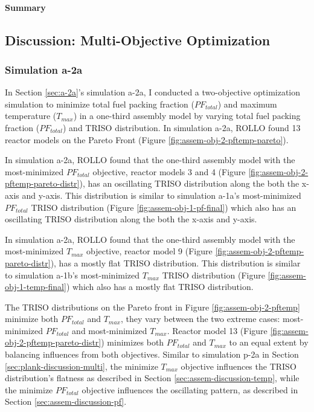 \paragraph{Summary}

\subsection{Discussion: Multi-Objective Optimization}
\label{sec:assem-discussion-multi}

\subsubsection{Simulation a-2a}
In Section \ref{sec:a-2a}'s simulation a-2a, I conducted a two-objective 
optimization simulation to minimize total fuel packing fraction ($PF_{total}$) and 
maximum temperature ($T_{max}$) in a one-third assembly model by varying total fuel 
packing fraction ($PF_{total}$) and TRISO distribution. 
In simulation a-2a, ROLLO found 13 reactor models on the Pareto Front (Figure 
\ref{fig:assem-obj-2-pftemp-pareto}). 

In simulation a-2a, \gls{ROLLO} found that the one-third assembly model with the 
most-minimized $PF_{total}$ objective, reactor models 3 and 4 (Figure 
\ref{fig:assem-obj-2-pftemp-pareto-distr}), has an oscillating TRISO distribution 
along the both the x-axis and y-axis. 
This distribution is similar to simulation a-1a's most-minimized $PF_{total}$ TRISO 
distribution (Figure \ref{fig:assem-obj-1-pf-final}) which also has an oscillating 
TRISO distribution along the both the x-axis and y-axis. 

In simulation a-2a, \gls{ROLLO} found that the one-third assembly model with the 
most-minimized $T_{max}$ objective, reactor model 9 (Figure 
\ref{fig:assem-obj-2-pftemp-pareto-distr}), has a mostly flat TRISO distribution. 
This distribution is similar to simulation a-1b's most-minimized $T_{max}$ TRISO 
distribution  (Figure \ref{fig:assem-obj-1-temp-final}) which also has a mostly 
flat TRISO distribution. 
 
The \gls{TRISO} distributions on the Pareto front in Figure \ref{fig:assem-obj-2-pftemp} 
minimize both $PF_{total}$ and $T_{max}$, they vary between the two extreme cases: 
most-minimized $PF_{total}$ and most-minimized $T_{max}$. 
Reactor model 13 (Figure \ref{fig:assem-obj-2-pftemp-pareto-distr}) minimizes both 
$PF_{total}$ and $T_{max}$ to an equal extent by balancing influences from both 
objectives. 
Similar to simulation p-2a in Section \ref{sec:plank-discussion-multi}, 
the minimize $T_{max}$ objective influences the TRISO distribution's flatness as 
described in Section \ref{sec:assem-discussion-temp}, while 
the minimize $PF_{total}$ objective influences the oscillating pattern, as described 
in Section \ref{sec:assem-discussion-pf}.

